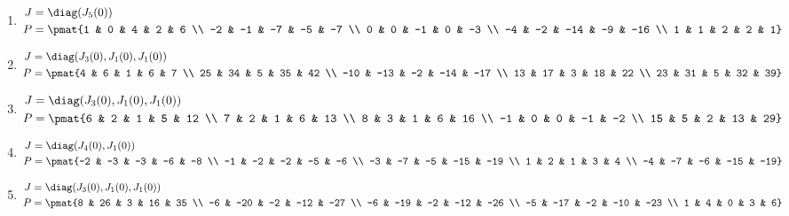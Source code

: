 \begin{enumerate}
\item

\begin{align*}
J &= \diag(J_{5}(0))\\
P &= \pmat{1 & 0 & 4 & 2 & 6 \\ -2 & -1 & -7 & -5 & -7 \\ 0 & 0 & -1 & 0 & -3 \\ -4 & -2 & -14 & -9 & -16 \\ 1 & 1 & 2 & 2 & 1}
\end{align*}

\item

\begin{align*}
J &= \diag(J_{3}(0), J_{1}(0), J_{1}(0))\\
P &= \pmat{4 & 6 & 1 & 6 & 7 \\ 25 & 34 & 5 & 35 & 42 \\ -10 & -13 & -2 & -14 & -17 \\ 13 & 17 & 3 & 18 & 22 \\ 23 & 31 & 5 & 32 & 39}
\end{align*}

\item

\begin{align*}
J &= \diag(J_{3}(0), J_{1}(0), J_{1}(0))\\
P &= \pmat{6 & 2 & 1 & 5 & 12 \\ 7 & 2 & 1 & 6 & 13 \\ 8 & 3 & 1 & 6 & 16 \\ -1 & 0 & 0 & -1 & -2 \\ 15 & 5 & 2 & 13 & 29}
\end{align*}

\item

\begin{align*}
J &= \diag(J_{4}(0), J_{1}(0))\\
P &= \pmat{-2 & -3 & -3 & -6 & -8 \\ -1 & -2 & -2 & -5 & -6 \\ -3 & -7 & -5 & -15 & -19 \\ 1 & 2 & 1 & 3 & 4 \\ -4 & -7 & -6 & -15 & -19}
\end{align*}

\item

\begin{align*}
J &= \diag(J_{3}(0), J_{1}(0), J_{1}(0))\\
P &= \pmat{8 & 26 & 3 & 16 & 35 \\ -6 & -20 & -2 & -12 & -27 \\ -6 & -19 & -2 & -12 & -26 \\ -5 & -17 & -2 & -10 & -23 \\ 1 & 4 & 0 & 3 & 6}
\end{align*}


\end{enumerate}
